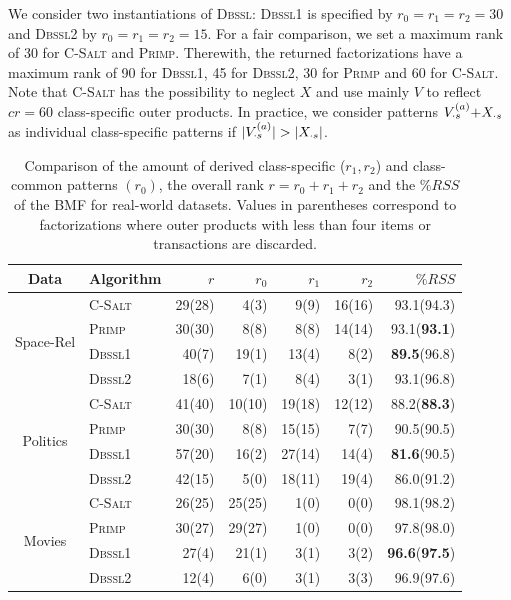 We consider two instantiations of \textsc{Dbssl}: \textsc{Dbssl1} is specified by $r_0=r_1=r_2=30$ and \textsc{Dbssl2} by $r_0=r_1=r_2=15$. For a fair comparison, we set a maximum rank of 30 for \textsc{C-Salt} and \textsc{Primp}. Therewith, the returned factorizations have a maximum rank of 90 for \textsc{Dbssl1}, 45 for \textsc{Dbssl2}, 30 for \textsc{Primp} and 60 for \textsc{C-Salt}. Note that \textsc{C-Salt} has the possibility to neglect $X$ and use mainly $V$ to reflect $cr=60$ class-specific outer products. In practice, we consider patterns $V^{(a)}_{\cdot s}{+}X_{\cdot s}$ as individual class-specific patterns if $|\Va_{\cdot s}|>|X_{\cdot  s}|$.
\begin{table}%
	\centering
	\begin{tabular}{clrrrrr}\toprule
    Data & Algorithm & $r$ & $r_0$ & $r_1$ & $r_2$  & $\%RSS$  \\ \midrule
\multirow{4}{*}{Space-Rel} 
 & \textsc{C-Salt} & 29(28) & 4(3) & 9(9) & 16(16) & 93.1(94.3)\\
 & \textsc{Primp} & 30(30) & 8(8) & 8(8) & 14(14) & 93.1(\textbf{93.1})\\
 & \textsc{Dbssl1} & 40(7) & 19(1) & 13(4) & 8(2) & \textbf{89.5}(96.8)\\ 
 & \textsc{Dbssl2} & 18(6) & 7(1) & 8(4) & 3(1) & 93.1(96.8)\\
 \midrule
\multirow{4}{*}{Politics} 
 & \textsc{C-Salt} & 41(40) & 10(10) & 19(18) & 12(12) & 88.2(\textbf{88.3})\\
 & \textsc{Primp} & 30(30) & 8(8) & 15(15) & 7(7) & 90.5(90.5)\\ 
 & \textsc{Dbssl1} & 57(20) & 16(2) & 27(14) & 14(4) & \textbf{81.6}(90.5)\\
 & \textsc{Dbssl2} & 42(15) & 5(0) & 18(11) & 19(4) & 86.0(91.2)\\
 \midrule
\multirow{4}{*}{Movies}
 & \textsc{C-Salt} & 26(25) & 25(25) & 1(0) & 0(0) & 98.1(98.2)\\
 & \textsc{Primp} & 30(27) & 29(27) & 1(0) & 0(0) & 97.8(98.0)\\
 & \textsc{Dbssl1} & 27(4) & 21(1) & 3(1) & 3(2) & \textbf{96.6}(\textbf{97.5})\\
 & \textsc{Dbssl2} & 12(4) & 6(0) & 3(1) & 3(3) & 96.9(97.6)\\ 
 \bottomrule
    \end{tabular}
    \caption{Comparison of the amount of derived class-specific ($r_1,r_2$) and class-common patterns $(r_0)$, the overall rank $r=r_0+r_1+r_2$ and the $\%RSS$ of the BMF for real-world datasets. Values in parentheses correspond to factorizations where outer products with less than four items or transactions are discarded.}
  \label{tbl:CS:realWorld}
\end{table}

